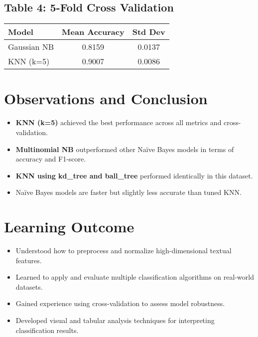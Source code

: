 \documentclass[12pt]{article}
\begin{document}
\subsection*{Table 4: 5-Fold Cross Validation}
\begin{center}
\begin{tabular}{lcc}
\toprule
\textbf{Model} & \textbf{Mean Accuracy} & \textbf{Std Dev} \\
\midrule
Gaussian NB & 0.8159 & 0.0137 \\
KNN (k=5)   & 0.9007 & 0.0086 \\
\bottomrule
\end{tabular}
\end{center}

\section*{Observations and Conclusion}
\begin{itemize}
  \item \textbf{KNN (k=5)} achieved the best performance across all metrics and cross-validation.
  \item \textbf{Multinomial NB} outperformed other Naïve Bayes models in terms of accuracy and F1-score.
  \item \textbf{KNN using kd\_tree and ball\_tree} performed identically in this dataset.
  \item Naïve Bayes models are faster but slightly less accurate than tuned KNN.
\end{itemize}

\section*{Learning Outcome}
\begin{itemize}
  \item Understood how to preprocess and normalize high-dimensional textual features.
  \item Learned to apply and evaluate multiple classification algorithms on real-world datasets.
  \item Gained experience using cross-validation to assess model robustness.
  \item Developed visual and tabular analysis techniques for interpreting classification results.
\end{itemize}
\end{document}
